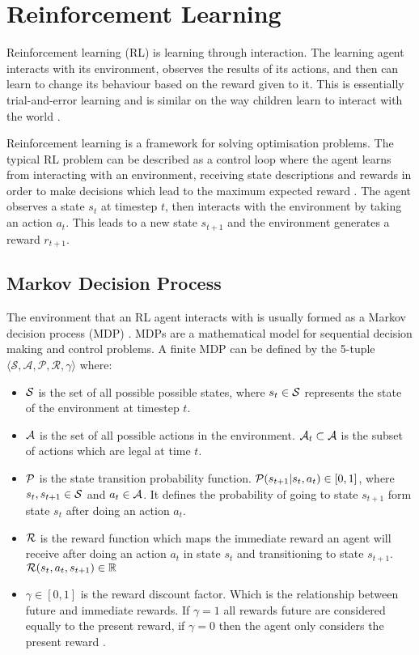\documentclass[../main.tex]{subfiles}
\begin{document}
\section{Reinforcement Learning}
Reinforcement learning (RL) is learning through interaction. The learning agent interacts with its environment, observes the results of its actions, and then can learn to change its behaviour based on the reward given to it. This is essentially trial-and-error learning and is similar on the way children learn to interact with the world \cite{sutton_reinforcement_2018}.

Reinforcement learning is a framework for solving optimisation problems. The typical RL problem can be described as a control loop where the agent learns from interacting with an environment, receiving state descriptions and rewards in order to make decisions which lead to the maximum expected reward \cite{mnih_human-level_2015}. The agent observes a state $s_t$ at timestep $t$, then interacts with the environment by taking an action $a_t$. This leads to a new state $s_{t+1}$ and the environment generates a reward $r_{t+1}$. 

\subsection{Markov Decision Process}
The environment that an RL agent interacts with is usually formed as a Markov decision process (MDP) \cite{hazeghi_markov_1995}. MDPs are a mathematical model for sequential decision making and control problems. A finite MDP can be defined by the 5-tuple $\langle \mathcal{S, A, P , R, } \gamma \rangle$ where:
\begin{itemize}[nosep]
    \item $\mathcal{S}$ is the set of all possible possible states, where $s_t \in \mathcal{S}$ represents the state of the environment at timestep $t$.
    \item $\mathcal{A}$ is the set of all possible actions in the environment. $\mathcal{A}_t \subset \mathcal{A}$ is the subset of actions which are legal at time $t$.
    \item $\mathcal{P}$ is the state transition probability function. $\mathcal{P}(s_{t+1} \vert s_t, a_t) \in [0, 1]$, where $s_t, s_{t+
    1} \in \mathcal{S}$ and $a_t \in \mathcal{A}$. It defines the probability of going to state $s_{t+1}$ form state $s_t$ after doing an action $a_t$.
    \item $\mathcal{R}$ is the reward function which maps the immediate reward an agent will receive after doing an action $a_t$ in state $s_t$ and transitioning to state $s_{t+1}$. $\mathcal{R}(s_t, a_t, s_{t+1}) \in \mathbb{R}$
    \item $\gamma \in [0, 1]$ is the reward discount factor. Which is the relationship between future and immediate rewards. If $\gamma = 1$ all rewards future are considered equally to the present reward, if $\gamma = 0$ then the agent only considers the present reward \cite{sutton_policy_2000}.
\end{itemize}
\end{document}
